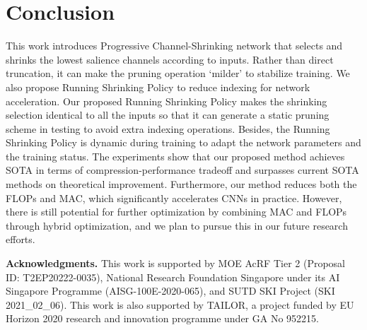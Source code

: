 \documentclass[lettersize,journal]{IEEEtran}
\begin{document}
\begin{table}[h]
\footnotesize
\caption{
Performance comparison with and without the Salience Generator on baseline (ResNet-18).
}
     \label{tab:salience_generator}
\end{table}




\section{Conclusion}
This work introduces Progressive Channel-Shrinking network that selects and shrinks the lowest salience channels according to inputs. Rather than direct truncation, it can make the pruning operation `milder' to stabilize training. We also propose Running Shrinking Policy to reduce indexing for network acceleration. Our proposed Running Shrinking Policy makes the shrinking selection identical to all the inputs so that it can generate a static pruning scheme in testing to avoid extra indexing operations. Besides, the Running Shrinking Policy is dynamic during training to adapt the network parameters and the training status. 
The experiments show that our proposed method achieves SOTA in terms of compression-performance tradeoff and surpasses current SOTA methods on theoretical improvement. 
Furthermore, our method reduces both the FLOPs and MAC, which significantly accelerates CNNs in practice.
However, there is still potential for further optimization by combining MAC and FLOPs through hybrid optimization, and we plan to pursue this in our future research efforts.

\noindent
\textbf{Acknowledgments.}
This work is supported by MOE AcRF Tier 2 (Proposal ID: T2EP20222-0035), National Research Foundation Singapore under its AI Singapore Programme (AISG-100E-2020-065), and SUTD SKI Project (SKI 2021\_02\_06).
This work is also supported by TAILOR, a project funded by EU Horizon 2020 research and innovation programme under GA No 952215.
\end{document}
